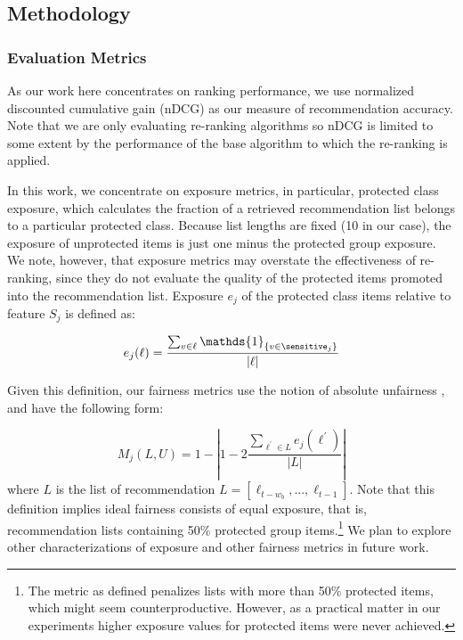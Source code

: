 \subsection{Methodology}

\subsubsection{Evaluation Metrics}
As our work here concentrates on ranking performance, we use normalized discounted cumulative gain (nDCG) as our measure of recommendation accuracy. Note that we are only evaluating re-ranking algorithms so nDCG is limited to some extent by the performance of the base algorithm to which the re-ranking is applied. 


In this work, we concentrate on exposure metrics, in particular, protected class exposure, which calculates the fraction of a retrieved recommendation list belongs to a particular protected class. 
Because list lengths are fixed (10 in our case), the exposure of unprotected items is just one minus the protected group exposure. We note, however, that exposure metrics may overstate the effectiveness of re-ranking, since they do not evaluate the quality of the protected items promoted into the recommendation list. Exposure $e_j$ of the protected class items relative to feature $S_j$ is defined as:

\begin{equation}
    e_j(\ell) = \frac{\sum_{v \in \ell}{\mathds{1}_{\{v \in \sensitive_j\}}}}{|\ell|}
\end{equation}

Given this definition, our fairness metrics use the notion of absolute unfairness \cite{yao2017beyond}, and have the following form:

\begin{equation}
    M_j(L, U) = 1 - | 1 - 2 \frac{\sum_{\ell^{\prime} \in L}{e_j(\ell^{\prime})}}{|L|} |
\end{equation}
where $L$ is the list of recommendation $L = [\ell_{t-w_b},...,\ell_{t-1}] $. Note that this definition implies ideal fairness consists of equal exposure, that is, recommendation lists containing 50\% protected group items.\footnote{The metric as defined penalizes lists with more than 50\% protected items, which might seem counterproductive. However, as a practical matter in our experiments higher exposure values for protected items were never achieved.} We plan to explore other characterizations of exposure and other fairness metrics in future work. 

